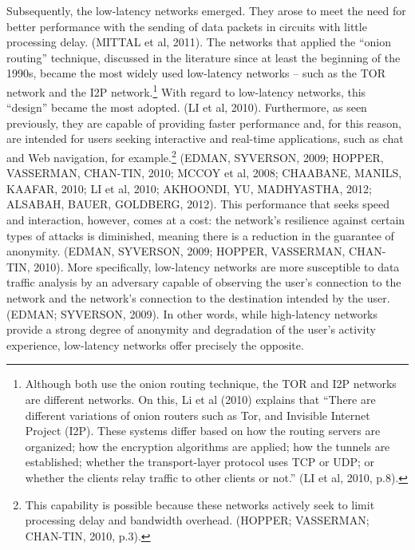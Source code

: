 Subsequently, the low-latency networks emerged. They arose to meet the need for better performance with the sending of data packets in circuits with little processing delay. (MITTAL et al, 2011). The networks that applied the ``onion routing'' technique, discussed in the literature since at least the beginning of the 1990s, became the most widely used low-latency networks -- such as the TOR network and the I2P network.\footnote{Although both use the onion routing technique, the TOR and I2P networks are different networks. On this, Li et al (2010) explains that ``There are different variations of onion routers such as Tor, and Invisible Internet Project (I2P). These systems differ based on how the routing servers are organized; how the encryption algorithms are applied; how the tunnels are established; whether the transport-layer protocol uses TCP or UDP; or whether the clients relay traffic to other clients or not.'' (LI et al, 2010, p.8).} With regard to low-latency networks, this ``design'' became the most adopted. (LI et al, 2010). Furthermore, as seen previously, they are capable of providing faster performance and, for this reason, are intended for users seeking interactive and real-time applications, such as chat and Web navigation, for example.\footnote{This capability is possible because these networks actively seek to limit processing delay and bandwidth overhead. (HOPPER; VASSERMAN; CHAN-TIN, 2010, p.3).} (EDMAN, SYVERSON, 2009; HOPPER, VASSERMAN, CHAN-TIN, 2010; MCCOY et al, 2008; CHAABANE, MANILS, KAAFAR, 2010; LI et al, 2010; AKHOONDI, YU, MADHYASTHA, 2012; ALSABAH, BAUER, GOLDBERG, 2012). This performance that seeks speed and interaction, however, comes at a cost: the network's resilience against certain types of attacks is diminished, meaning there is a reduction in the guarantee of anonymity. (EDMAN, SYVERSON, 2009; HOPPER, VASSERMAN, CHAN-TIN, 2010). More specifically, low-latency networks are more susceptible to data traffic analysis by an adversary capable of observing the user's connection to the network and the network's connection to the destination intended by the user. (EDMAN; SYVERSON, 2009). In other words, while high-latency networks provide a strong degree of anonymity and degradation of the user's activity experience, low-latency networks offer precisely the opposite.


